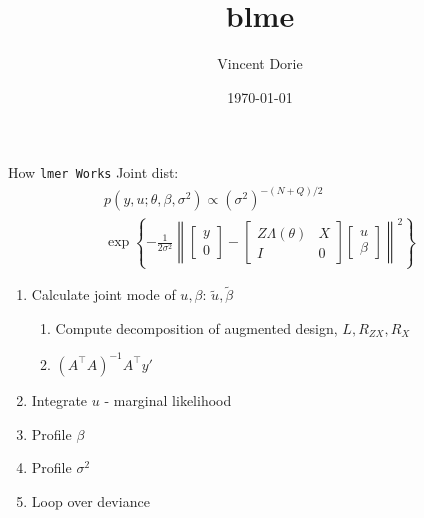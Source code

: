\documentclass{beamer}
\title[blme]{blme}
\author[Vincent Dorie]{Vincent Dorie}
\institute{New York University}
\date{\today}
\begin{document}
\setlength{\parindent}{0pt}


\begin{frame}{How \tt{lmer} Works}
Joint dist:
\vspace{-0.1in}
\begin{multline*}
p(y, u; \theta, \beta, \sigma^2) \propto
(\sigma^2)^{-(N + Q) / 2} \\
\exp\left\{
-\frac{1}{2\sigma^2}\left\|
\begin{bmatrix}
y \\ 0 \end{bmatrix}
-\begin{bmatrix}Z\Lambda(\theta) & X \\
I & 0
\end{bmatrix}
\begin{bmatrix} u \\ \beta \end{bmatrix} \right\|^2\right\}
\end{multline*}

\begin{enumerate}
\item Calculate joint mode of $u, \beta$: $\tilde{u}, \tilde\beta$
\begin{enumerate}
\item Compute decomposition of augmented design, $L, R_{ZX}, R_X$
\item $(A^\top A)^{-1}A^\top y'$
\end{enumerate}
\item Integrate $u$ - marginal likelihood
\item Profile $\beta$
\item Profile $\sigma^2$
\item Loop over deviance
\end{enumerate}
\end{frame}
\end{document}
